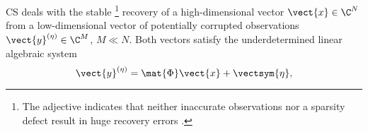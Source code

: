 \ac{CS} deals with
the stable%
\footnote{
  The adjective  indicates that
  neither inaccurate observations nor
  a sparsity defect result in
  huge recovery errors
  \cite[7, 8]{book:Foucart2013}.
}
recovery of
a high-dimensional vector
$\vect{x} \in \C^{ N }$ from
a low-dimensional vector of
potentially corrupted observations
$\vect{y}^{(\eta)} \in \C^{ M }$, $M \ll N$.
Both vectors satisfy
the underdetermined linear algebraic system
\begin{equation}
  \vect{y}^{(\eta)}
  =
  \mat{\Phi}
  \vect{x}
  +
  \vectsym{\eta},
 \label{eqn:cs_math_prob_general_obs_error}
\end{equation}
